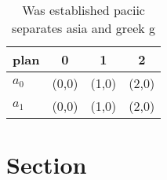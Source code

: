 \documentclass[a4paper]{article}
\begin{document}
\begin{table}
\begin{adjustbox}{width=0.6\columnwidth}
\begin{tabular}{|l|l|l|l|}
\hline
\textbf{plan} & \multicolumn{1}{c|}{\textbf{0}} & \multicolumn{1}{c|}{\textbf{1}} & \multicolumn{1}{c|}{\textbf{2}} \\ \hline
\textbf{$a_0$}  & (0,0) & (1,0) & (2,0) \\ \hline
\textbf{$a_1$}  & (0,0) & (1,0) & (2,0) \\ \hline
\end{tabular}
\end{adjustbox}
\caption{Was established paciic separates asia and greek g
}
\end{table}

\section{Section}
\end{document}
